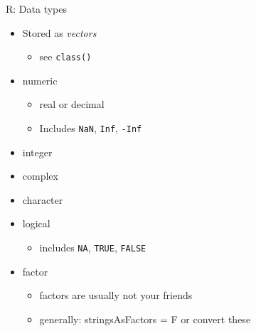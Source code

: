 \documentclass[
  ignorenonframetext,
]{beamer}
\providecommand{\tightlist}{%
  \setlength{\itemsep}{0pt}\setlength{\parskip}{0pt}}
\begin{document}
\begin{frame}[fragile]{R: Data types}
\protect\hypertarget{r-data-types}{}

\begin{itemize}
\tightlist
\item
  Stored as \emph{vectors}

  \begin{itemize}
  \tightlist
  \item
    see \texttt{class()}
  \end{itemize}
\item
  numeric

  \begin{itemize}
  \tightlist
  \item
    real or decimal
  \item
    Includes \texttt{NaN}, \texttt{Inf}, \texttt{-Inf}
  \end{itemize}
\item
  integer
\item
  complex
\item
  character
\item
  logical

  \begin{itemize}
  \tightlist
  \item
    includes \texttt{NA}, \texttt{TRUE}, \texttt{FALSE}
  \end{itemize}
\item
  factor

  \begin{itemize}
  \tightlist
  \item
    factors are usually not your friends
  \item
    generally: stringsAsFactors = F or convert these
  \end{itemize}
\end{itemize}

\end{frame}
\end{document}
